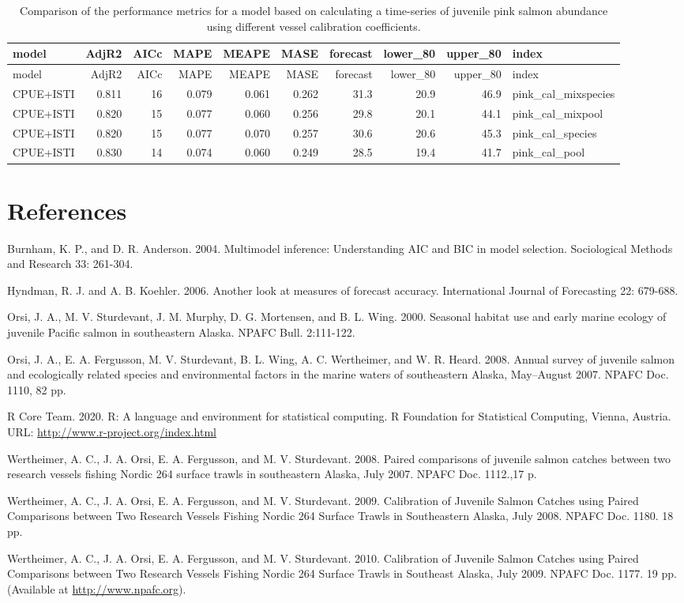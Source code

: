 \documentclass[]{article}
\begin{document}
\begin{longtable}[]{@{}lrrrrrrrrl@{}}
\caption{Comparison of the performance metrics for a model based on
calculating a time-series of juvenile pink salmon abundance using
different vessel calibration coefficients.}\tabularnewline
\toprule
model & AdjR2 & AICc & MAPE & MEAPE & MASE & forecast & lower\_80 &
upper\_80 & index\tabularnewline
\midrule
\endfirsthead
\toprule
model & AdjR2 & AICc & MAPE & MEAPE & MASE & forecast & lower\_80 &
upper\_80 & index\tabularnewline
\midrule
\endhead
CPUE+ISTI & 0.811 & 16 & 0.079 & 0.061 & 0.262 & 31.3 & 20.9 & 46.9 &
pink\_cal\_mixspecies\tabularnewline
CPUE+ISTI & 0.820 & 15 & 0.077 & 0.060 & 0.256 & 29.8 & 20.1 & 44.1 &
pink\_cal\_mixpool\tabularnewline
CPUE+ISTI & 0.820 & 15 & 0.077 & 0.070 & 0.257 & 30.6 & 20.6 & 45.3 &
pink\_cal\_species\tabularnewline
CPUE+ISTI & 0.830 & 14 & 0.074 & 0.060 & 0.249 & 28.5 & 19.4 & 41.7 &
pink\_cal\_pool\tabularnewline
\bottomrule
\end{longtable}

\section{References}\label{references}

Burnham, K. P., and D. R. Anderson. 2004. Multimodel inference:
Understanding AIC and BIC in model selection. Sociological Methods and
Research 33: 261-304.

Hyndman, R. J. and A. B. Koehler. 2006. Another look at measures of
forecast accuracy. International Journal of Forecasting 22: 679-688.

Orsi, J. A., M. V. Sturdevant, J. M. Murphy, D. G. Mortensen, and B. L.
Wing. 2000. Seasonal habitat use and early marine ecology of juvenile
Pacific salmon in southeastern Alaska. NPAFC Bull. 2:111-122.

Orsi, J. A., E. A. Fergusson, M. V. Sturdevant, B. L. Wing, A. C.
Wertheimer, and W. R. Heard. 2008. Annual survey of juvenile salmon and
ecologically related species and environmental factors in the marine
waters of southeastern Alaska, May--August 2007. NPAFC Doc. 1110, 82 pp.

R Core Team. 2020. R: A language and environment for statistical
computing. R Foundation for Statistical Computing, Vienna, Austria. URL:
\url{http://www.r-project.org/index.html}

Wertheimer, A. C., J. A. Orsi, E. A. Fergusson, and M. V. Sturdevant.
2008. Paired comparisons of juvenile salmon catches between two research
vessels fishing Nordic 264 surface trawls in southeastern Alaska, July
2007. NPAFC Doc. 1112.,17 p.

Wertheimer, A. C., J. A. Orsi, E. A. Fergusson, and M. V. Sturdevant.
2009. Calibration of Juvenile Salmon Catches using Paired Comparisons
between Two Research Vessels Fishing Nordic 264 Surface Trawls in
Southeastern Alaska, July 2008. NPAFC Doc. 1180. 18 pp.

Wertheimer, A. C., J. A. Orsi, E. A. Fergusson, and M. V. Sturdevant.
2010. Calibration of Juvenile Salmon Catches using Paired Comparisons
between Two Research Vessels Fishing Nordic 264 Surface Trawls in
Southeast Alaska, July 2009. NPAFC Doc. 1177. 19 pp. (Available at
\url{http://www.npafc.org}).
\end{document}
